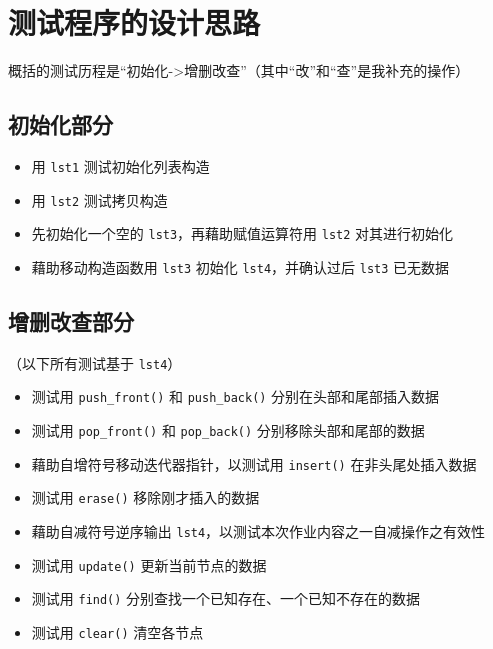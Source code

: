 \documentclass[UTF8]{ctexart}
\begin{document}
\pagestyle{fancy}
\fancyhead{}

\section{测试程序的设计思路}

概括的测试历程是“初始化->增删改查”（其中“改”和“查”是我补充的操作）

\subsection{初始化部分}
\begin{itemize}
  \item 用 \texttt{lst1} 测试初始化列表构造
  \item 用 \texttt{lst2} 测试拷贝构造
  \item 先初始化一个空的 \texttt{lst3}，再藉助赋值运算符用 \texttt{lst2} 对其进行初始化
  \item 藉助移动构造函数用 \texttt{lst3} 初始化 \texttt{lst4}，并确认过后 \texttt{lst3} 已无数据
\end{itemize}

\subsection{增删改查部分}
（以下所有测试基于 \texttt{lst4}）
\begin{itemize}
  \item 测试用 \texttt{push\_front()} 和 \texttt{push\_back()} 分别在头部和尾部插入数据
  \item 测试用 \texttt{pop\_front()} 和 \texttt{pop\_back()} 分别移除头部和尾部的数据
  \item 藉助自增符号移动迭代器指针，以测试用 \texttt{insert()} 在非头尾处插入数据
  \item 测试用 \texttt{erase()} 移除刚才插入的数据
\end{itemize}
\begin{itemize}
  \item 藉助自减符号逆序输出 \texttt{lst4}，以测试本次作业内容之一自减操作之有效性
  \item 测试用 \texttt{update()} 更新当前节点的数据
  \item 测试用 \texttt{find()} 分别查找一个已知存在、一个已知不存在的数据
\end{itemize}
\begin{itemize}
  \item 测试用 \texttt{clear()} 清空各节点
\end{itemize}
\end{document}
